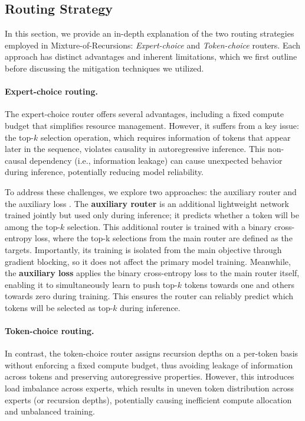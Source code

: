 

\clearpage
\subsection{Routing Strategy}
In this section, we provide an in-depth explanation of the two routing strategies employed in Mixture-of-Recursions: \textit{Expert-choice} and \textit{Token-choice} routers. Each approach has distinct advantages and inherent limitations, which we first outline before discussing the mitigation techniques we utilized.


\vspace{-10pt}
\paragraph{Expert-choice routing.}
The expert-choice router offers several advantages, including a fixed compute budget that simplifies resource management. However, it suffers from a key issue: the top-$k$ selection operation, which requires information of tokens that appear later in the sequence, violates causality in autoregressive inference. This non-causal dependency (i.e., information leakage) can cause unexpected behavior during inference, potentially reducing model reliability. 

To address these challenges, we explore two approaches: the auxiliary router and the auxiliary loss \citep{raposo2024mixture}. The \textbf{auxiliary router} is an additional lightweight network trained jointly but used only during inference; it predicts whether a token will be among the top-$k$ selection. This additional router is trained with a binary cross-entropy loss, where the top-k selections from the main router are defined as the targets. Importantly, its training is isolated from the main objective through gradient blocking, so it does not affect the primary model training. Meanwhile, the \textbf{auxiliary loss} applies the binary cross-entropy loss to the main router itself, enabling it to simultaneously learn to push top-$k$ tokens towards one and others towards zero during training. This ensures the router can reliably predict which tokens will be selected as top-$k$ during inference.


\vspace{-10pt}
\paragraph{Token-choice routing.}
In contrast, the token-choice router assigns recursion depths on a per-token basis without enforcing a fixed compute budget, thus avoiding leakage of information across tokens and preserving autoregressive properties. However, this introduces load imbalance across experts, which results in uneven token distribution across experts (or recursion depths), potentially causing inefficient compute allocation and unbalanced training.

